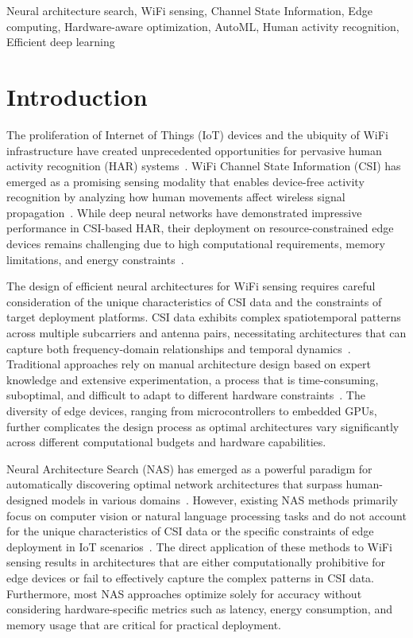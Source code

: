 \documentclass[journal]{IEEEtran}
\begin{document}
\begin{IEEEkeywords}
Neural architecture search, WiFi sensing, Channel State Information, Edge computing, Hardware-aware optimization, AutoML, Human activity recognition, Efficient deep learning
\end{IEEEkeywords}

\section{Introduction}

The proliferation of Internet of Things (IoT) devices and the ubiquity of WiFi infrastructure have created unprecedented opportunities for pervasive human activity recognition (HAR) systems~\cite{tmc2024nas, iotj2023efficient}. WiFi Channel State Information (CSI) has emerged as a promising sensing modality that enables device-free activity recognition by analyzing how human movements affect wireless signal propagation~\cite{sensefi2023, efficientfi2022}. While deep neural networks have demonstrated impressive performance in CSI-based HAR, their deployment on resource-constrained edge devices remains challenging due to high computational requirements, memory limitations, and energy constraints~\cite{edge2024challenges}.

The design of efficient neural architectures for WiFi sensing requires careful consideration of the unique characteristics of CSI data and the constraints of target deployment platforms. CSI data exhibits complex spatiotemporal patterns across multiple subcarriers and antenna pairs, necessitating architectures that can capture both frequency-domain relationships and temporal dynamics~\cite{csi2023patterns}. Traditional approaches rely on manual architecture design based on expert knowledge and extensive experimentation, a process that is time-consuming, suboptimal, and difficult to adapt to different hardware constraints~\cite{manual2023limitations}. The diversity of edge devices, ranging from microcontrollers to embedded GPUs, further complicates the design process as optimal architectures vary significantly across different computational budgets and hardware capabilities.

Neural Architecture Search (NAS) has emerged as a powerful paradigm for automatically discovering optimal network architectures that surpass human-designed models in various domains~\cite{nas2022survey}. However, existing NAS methods primarily focus on computer vision or natural language processing tasks and do not account for the unique characteristics of CSI data or the specific constraints of edge deployment in IoT scenarios~\cite{nas2023challenges}. The direct application of these methods to WiFi sensing results in architectures that are either computationally prohibitive for edge devices or fail to effectively capture the complex patterns in CSI data. Furthermore, most NAS approaches optimize solely for accuracy without considering hardware-specific metrics such as latency, energy consumption, and memory usage that are critical for practical deployment.
\end{document}
